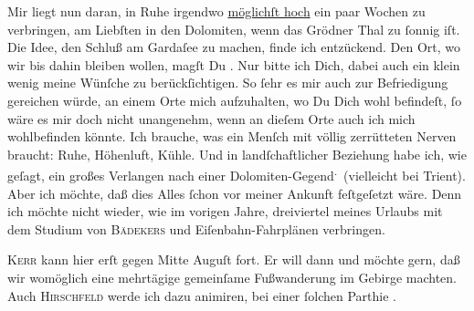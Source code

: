\pstart
           Mir liegt nun daran, in Ruhe irgendwo \uline{möglichſt hoch}
               ein paar Wochen zu verbringen, am Liebſten in den Dolomiten, wenn das Grödner Thal zu{ }ſonnig iſt. Die Idee, den Schluß am Gardaſee zu
               machen, finde ich entzückend. Den Ort, wo wir bis dahin bleiben wollen, magſt Du
                  \label{K_L03073-3v}\label{K_L03073-3}. Nur bitte ich Dich, dabei auch ein klein wenig meine Wünſche zu
               berückſichtigen. So{ }ſehr {\pb}es mir auch zur Befriedigung
               gereichen würde, an einem Orte mich aufzuhalten, wo Du Dich wohl befindeſt,{ }ſo wäre
               es mir doch nicht \strikeout{\textcolor{gray}{×}} unangenehm, wenn an dieſem Orte auch ich mich wohlbefinden könnte. Ich
               brauche, was ein Menſch mit völlig zerrütteten Nerven braucht: Ruhe, Höhenluft,
               Kühle. Und in landſchaftlicher Beziehung habe ich, wie geſagt, ein großes  Verlangen nach einer Dolomiten-Gegend\substVorne{}\textsuperscript{.}\substDazwischen{} (\substHinten{}vielleicht bei Trient). Aber ich möchte,
               daß dies Alles{ }ſchon vor meiner Ankunft {\pb}feſtgeſetzt
               wäre. Denn ich möchte nicht wieder, wie im vorigen Jahre,
               dreiviertel meines Urlaubs mit dem Studium von \textsc{Bädekers} und Eiſenbahn-Fahrplänen verbringen.\pend
           
\pstart
           \textsc{Kerr} kann hier erſt gegen Mitte Auguſt fort. Er will
               dann \label{K_L03073-4v}\label{K_L03073-4} und möchte gern, daß
               wir womöglich eine mehrtägige gemeinſame Fußwanderung im Gebirge machten. Auch \textsc{Hirschfeld}{ }{\pb}werde ich dazu animiren, bei einer{ }ſolchen Parthie
                  \label{K_L03073-5v}\label{K_L03073-5}.\pend
           
